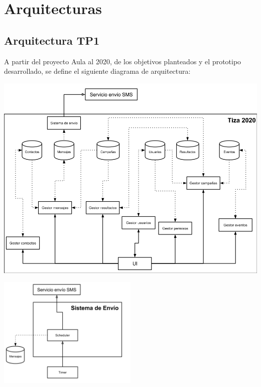 \documentclass[a4paper, 11pt]{article}
\begin{document}
\newpage

\section{Arquitecturas}
\subsection{Arquitectura TP1}
A partir del proyecto Aula al 2020, de los objetivos planteados y el prototipo desarrollado, se define el siguiente diagrama de arquitectura:

\centerline{\includegraphics[width=1.2\textwidth]{./diagramas/ArquitecturaTP1.png}}
\centerline{\includegraphics[width=0.5\textwidth]{./diagramas/ArqTP1SistEnvio.png}}
\end{document}
